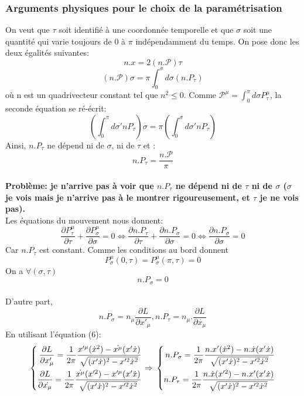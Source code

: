 \documentclass[a4paper,12pt]{article}
\def\xmu{x^\mu}
\begin{document}
\subsubsection{Arguments physiques pour le choix de la paramétrisation}
On veut que $\tau$ soit identifié à une coordonnée temporelle et que $\sigma$ soit une quantité qui varie toujours de $0$ à $\pi$ indépendamment du temps.
On pose donc les deux égalités suivantes:
$$n.x=2(n.\mathcal{P})\tau$$
$$(n.\mathcal{P})\sigma=\pi\int_0^\sigma d\sigma (n.P_\tau)$$
où n est un quadrivecteur constant tel que $n^2\leq0$.
Comme $\mathcal{P^\mu}=\int_0^\pi d\sigma P_\tau^\mu$, la seconde équation se ré-écrit:
$$\left( \int_0^\pi d\sigma' nP_\tau\right) \sigma=\pi\left( \int_0^\sigma d\sigma'nP_\tau\right) $$
Ainsi, $n.P_\tau$ ne dépend ni de $\sigma$, ni de $\tau$ et :
$$n.P_\tau=\frac{n.\mathcal{P}}{\pi}$$\\
\textbf{Problème: je n'arrive pas à voir que $n.P_\tau$ ne dépend ni de $\tau$ ni de $\sigma$ ($\sigma$ je vois mais je n'arrive pas à le montrer rigoureusement, et $\tau$ je ne vois pas).}\\
Les équations du mouvement nous donnent:
$$\frac{\partial P^{\mu}_{\tau}}{\partial \tau}+\frac{\partial P^{\mu}_{\sigma}}{\partial \sigma}=0 \Leftrightarrow \frac{\partial n.P_{\tau}}{\partial \tau}+\frac{\partial n.P_{\sigma}}{\partial \sigma}=0 \Leftrightarrow \frac{\partial n.P_{\sigma}}{\partial \sigma}=0$$
Car $n.P_\tau$ est constant.
Comme les conditions au bord donnent
$$P_\sigma^\mu(0,\tau)=P_\sigma^\mu(\pi,\tau)=0$$
On a $\forall (\sigma,\tau)$ $$n.P_\sigma=0 $$\\
D'autre part, 
$$n.P_\sigma=n_\mu \frac{\partial L}{\partial x'_\mu }, n.P_\tau=n_\mu.\frac{\partial L}{\partial \dot{x_\mu}}$$
En utilisant l'équation (6):
\begin{equation}
	\left\lbrace
	\begin{aligned}
	\frac{\partial L}{\partial x'_\mu }=\frac{1}{2\pi}\frac{x'^\mu (\dot{x}^2)-\dot{\xmu}(x'\dot{x})}{\sqrt{(x'\dot{x})^2-x'^2\dot{x}^2}}\\
	\frac{\partial L}{\partial \dot{x_\mu}}=\frac{1}{2\pi}\frac{\dot{\xmu} (x'^2)-x'^\mu(x'\dot{x})}{\sqrt{(x'\dot{x})^2-x'^2\dot{x}^2}}\\
	\end{aligned}
	\right.
	\Rightarrow\\
	\left\lbrace
	\begin{aligned}
	n.P_\sigma=\frac{1}{2\pi}\frac{n.x' (\dot{x}^2)-n.\dot{x}(x'\dot{x})}{\sqrt{(x'\dot{x})^2-x'^2\dot{x}^2}}\\
	n.P_\tau=\frac{1}{2\pi}\frac{n.\dot{x} (x'^2)-n.x'(x'\dot{x})}{\sqrt{(x'\dot{x})^2-x'^2\dot{x}^2}}
	\end{aligned}
	\right.
\end{equation}
\end{document}
